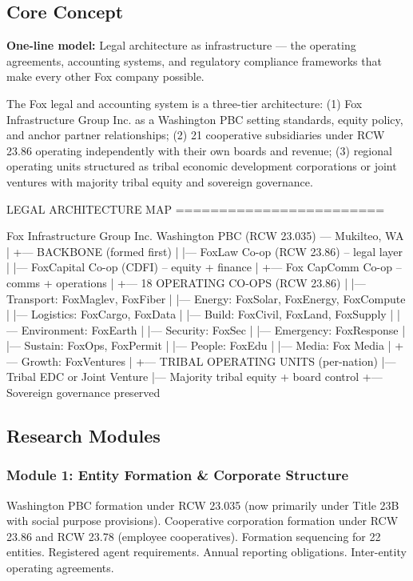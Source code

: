 \documentclass[11pt,letterpaper]{article}
\begin{document}
\subsection{Core Concept}

\textbf{One-line model:} Legal architecture as infrastructure --- the operating agreements, accounting systems, and regulatory compliance frameworks that make every other Fox company possible.

The Fox legal and accounting system is a three-tier architecture: (1) Fox Infrastructure Group Inc. as a Washington PBC setting standards, equity policy, and anchor partner relationships; (2) 21 cooperative subsidiaries under RCW 23.86 operating independently with their own boards and revenue; (3) regional operating units structured as tribal economic development corporations or joint ventures with majority tribal equity and sovereign governance.

\begin{asciibox}
LEGAL ARCHITECTURE MAP
========================

  Fox Infrastructure Group Inc.
  Washington PBC (RCW 23.035) --- Mukilteo, WA
  |
  +--- BACKBONE (formed first)
  |    |--- FoxLaw Co-op (RCW 23.86) -- legal layer
  |    |--- FoxCapital Co-op (CDFI) -- equity + finance
  |    +--- Fox CapComm Co-op -- comms + operations
  |
  +--- 18 OPERATING CO-OPS (RCW 23.86)
  |    |--- Transport: FoxMaglev, FoxFiber
  |    |--- Energy: FoxSolar, FoxEnergy, FoxCompute
  |    |--- Logistics: FoxCargo, FoxData
  |    |--- Build: FoxCivil, FoxLand, FoxSupply
  |    |--- Environment: FoxEarth
  |    |--- Security: FoxSec
  |    |--- Emergency: FoxResponse
  |    |--- Sustain: FoxOps, FoxPermit
  |    |--- People: FoxEdu
  |    |--- Media: Fox Media
  |    +--- Growth: FoxVentures
  |
  +--- TRIBAL OPERATING UNITS (per-nation)
       |--- Tribal EDC or Joint Venture
       |--- Majority tribal equity + board control
       +--- Sovereign governance preserved
\end{asciibox}

\subsection{Research Modules}

\subsubsection{Module 1: Entity Formation \& Corporate Structure}
Washington PBC formation under RCW 23.035 (now primarily under Title 23B with social purpose provisions). Cooperative corporation formation under RCW 23.86 and RCW 23.78 (employee cooperatives). Formation sequencing for 22 entities. Registered agent requirements. Annual reporting obligations. Inter-entity operating agreements.
\end{document}
